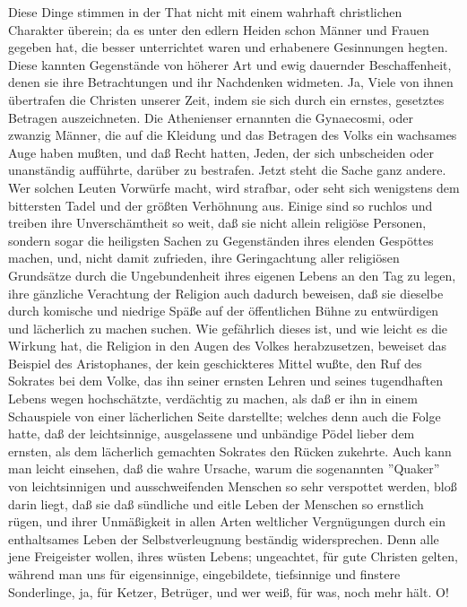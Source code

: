 Diese Dinge stimmen in der That nicht mit einem wahrhaft christlichen Charakter
überein; da es unter den edlern Heiden schon Männer und Frauen gegeben hat, die
besser unterrichtet waren und erhabenere Gesinnungen hegten. Diese kannten
Gegenstände von höherer Art und ewig dauernder Beschaffenheit, denen sie ihre
Betrachtungen und ihr Nachdenken widmeten. Ja, Viele von ihnen übertrafen die
Christen unserer Zeit, indem sie sich durch ein ernstes, gesetztes Betragen
auszeichneten. Die Athenienser ernannten die Gynaecosmi, oder zwanzig Männer,
die auf die Kleidung und das Betragen des Volks ein wachsames Auge haben mußten,
und daß Recht hatten, Jeden, der sich unbscheiden oder unanständig aufführte,
darüber zu bestrafen. Jetzt steht die Sache ganz andere. Wer solchen Leuten
Vorwürfe macht, wird strafbar, oder seht sich wenigstens dem bittersten Tadel
und der größten Verhöhnung aus. Einige sind so ruchlos und treiben ihre
Unverschämtheit so weit, daß sie nicht allein religiöse Personen, sondern sogar
die heiligsten Sachen zu Gegenständen ihres elenden Gespöttes machen, und, nicht
damit zufrieden, ihre Geringachtung aller religiösen Grundsätze durch die
Ungebundenheit ihres eigenen Lebens an den Tag zu legen, ihre gänzliche
Verachtung der Religion auch dadurch beweisen, daß sie dieselbe durch komische
und niedrige Späße auf der öffentlichen Bühne zu entwürdigen und lächerlich zu
machen suchen. Wie gefährlich dieses ist, und wie leicht es die Wirkung hat, die
Religion in den Augen des Volkes herabzusetzen, beweiset das Beispiel des
Aristophanes, der kein geschickteres Mittel wußte, den Ruf des Sokrates bei dem
Volke, das ihn seiner ernsten Lehren und seines tugendhaften Lebens wegen
hochschätzte, verdächtig zu machen, als daß er ihn in einem Schauspiele von
einer lächerlichen Seite darstellte; welches denn auch die Folge hatte, daß der
leichtsinnige, ausgelassene und unbändige Pödel lieber dem ernsten, als dem
lächerlich gemachten Sokrates den Rücken zukehrte. Auch kann man leicht
einsehen, daß die wahre Ursache, warum die sogenannten ''Quaker'' von
leichtsinnigen und ausschweifenden Menschen so sehr verspottet werden, bloß
darin liegt, daß sie daß sündliche und eitle Leben der Menschen so ernstlich
rügen, und ihrer Unmäßigkeit in allen Arten weltlicher Vergnügungen durch ein
enthaltsames Leben der Selbstverleugnung beständig widersprechen. Denn alle jene
Freigeister wollen, ihres wüsten Lebens; ungeachtet, für gute Christen gelten,
während man uns für eigensinnige, eingebildete, tiefsinnige und finstere
Sonderlinge, ja, für Ketzer, Betrüger, und wer weiß, für was, noch mehr hält. O!
